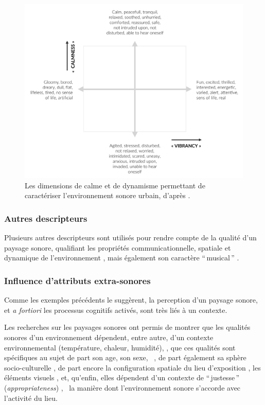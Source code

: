 \begin{figure}[t]
        \myfloatalign
        \includegraphics[width=.8\linewidth]{gfx/ch_3/calmVibran}
        \caption[Les dimensions de calme et de dynamisme permettant de caractériser l'environnement sonore urbain.]{Les dimensions de calme et de dynamisme permettant de caractériser l'environnement sonore urbain, d'après \citep{cain2013development}.}\label{fig:calmVibran}
\end{figure}

\subsubsection{Autres descripteurs}

Plusieurs autres descripteurs sont utilisés pour rendre compte de la qualité d'un paysage sonore, qualifiant les propriétés communicationnelle, spatiale et dynamique de l'environnement \citep{kang2010semantic}, mais également son caractère ``\,musical\,'' \citep{botteldooren2006temporal}.

\subsubsection{Influence d'attributs extra-sonores}
\label{sec:ch3_contexteDimension}

Comme les exemples précédents le suggèrent, la perception d'un paysage sonore, et \emph{a fortiori} les processus cognitifs activés, sont très liés à un contexte.

Les recherches sur les paysages sonores ont permis de montrer que les qualités sonores d'un environnement dépendent, entre autre, d'un contexte environnemental (température, chaleur, humidité), \citep{meng2013field,jeon2011non}, que ces qualités sont spécifiques au sujet de part son age, son sexe, \etc~, de part également sa sphère socio-culturelle \citep{hall2013exploratory,yu2010factors,guillen2007importance}, de part encore la configuration spatiale du lieu d'exposition \citep{hall2013exploratory}, les éléments visuels \citep{de2006quiet,guillen2007importance}, et, qu'enfin, elles dépendent d'un contexte de ``\,justesse\,'' (\emph{appropriateness}) \citep{nielbo2013investigating,de2006quiet}, \ie~la manière dont l'environnement sonore s'accorde avec l'activité du lieu.
 
